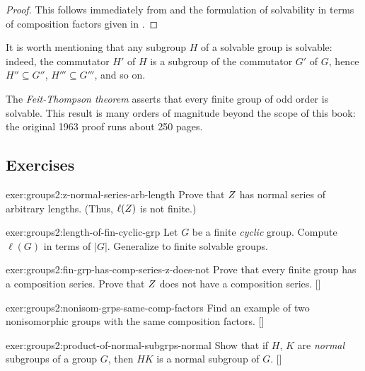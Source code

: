 \begin{proof}
  This follows immediately from 
  and the formulation of solvability in terms of composition factors
  given in .
\end{proof}
It is worth mentioning that any subgroup $H$ of a solvable group is
solvable: indeed, the commutator $H'$ of $H$ is a subgroup of the
commutator $G'$ of $G$, hence $H'' \subseteq G''$,
$H''' \subseteq G'''$, and so on.

The \emph{Feit-Thompson theorem} asserts that every finite group of
odd order is solvable. This result is many orders of magnitude beyond
the scope of this book: the original 1963 proof runs about 250 pages.

\subsection*{Exercises}

\begin{exer}{}{exer:groups2:z-normal-series-arb-length}
  Prove that $Z$ has normal series of arbitrary lengths. (Thus,
  $\ell(Z)$ is not finite.)
\end{exer}

\begin{exer}{}{exer:groups2:length-of-fin-cyclic-grp}
  Let $G$ be a finite \emph{cyclic} group. Compute $\ell(G)$ in terms
  of $|G|$. Generalize to finite solvable groups.
\end{exer}
\begin{exer}{}{exer:groups2:fin-grp-has-comp-series-z-does-not}
  \exerused Prove that every finite group has a composition
  series. Prove that $Z$ does not have a composition
  series. []
\end{exer}

\begin{exer}{}{exer:groups2:nonisom-grps-same-comp-factors}
  \exerused Find an example of two nonisomorphic groups with the same
  composition
  factors. []
\end{exer}
\begin{exer}{}{exer:groups2:product-of-normal-subgrps-normal}
  \exerused Show that if $H$, $K$ are \emph{normal} subgroups of a
  group $G$, then $HK$ is a normal subgroup of
  $G$. []
\end{exer}

